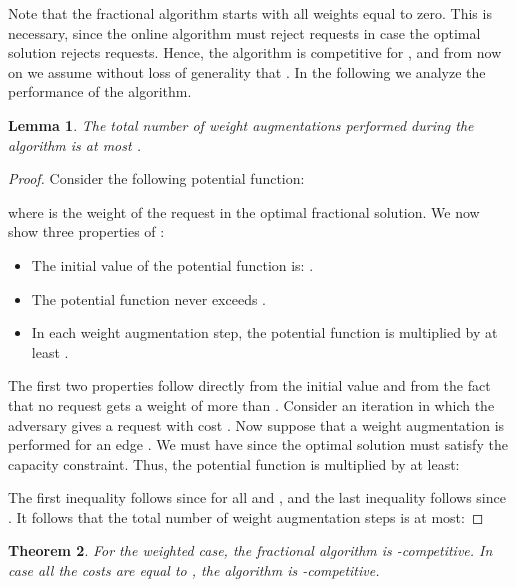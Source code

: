 \documentclass{sig-alternate}
\newtheorem{theorem}{Theorem}\newtheorem{prop}[theorem]{Proposition}
\newtheorem{lemma}[theorem]{Lemma}
\begin{document}
Note that the fractional algorithm starts with all weights equal
to zero. This is necessary, since the online algorithm must reject
 requests in case the optimal solution rejects  requests.
Hence, the algorithm is competitive for , and from now
on we assume without loss of generality that . In the
following we analyze the performance of the algorithm.

\begin{lemma}\label{frac_steps}
The total number of weight augmentations performed during the
algorithm is at most .
\end{lemma}

\begin{proof}
Consider the following potential function:

where  is the weight of the request  in the optimal
fractional solution. We now show three properties of :
\begin{itemize}
    \item The initial value of the potential function is:
    .
    \item The potential function never exceeds .
    \item In each weight augmentation step, the potential function
    is multiplied by at least .
\end{itemize}
The first two properties follow directly from the initial value
and from the fact that no request gets a weight of more than
. Consider an iteration in which the adversary
gives a request  with cost . Now suppose that a weight
augmentation is performed for an edge . We must have  since the optimal solution must
satisfy the capacity constraint. Thus, the potential function is
multiplied by at least:

The first inequality follows since for all  and ,  and the last inequality follows since
. It follows that the total
number of weight augmentation steps is at most:

\end{proof}

\begin{theorem}\label{frac_comp}
For the weighted case, the fractional algorithm is -competitive. In case all the costs are equal to , the
algorithm is -competitive.
\end{theorem}
\end{document}
